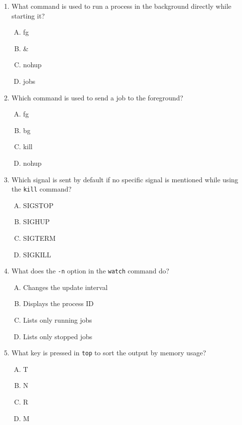 \documentclass[a4paper]{report}
\begin{document}
\begin{enumerate}[1.]

    \item What command is used to run a process in the background directly while starting it?  
    \begin{enumerate}[A)]
        \item fg  
        \item \&  
        \item nohup  
        \item jobs  
    \end{enumerate}

    \item Which command is used to send a job to the foreground?  
    \begin{enumerate}[A)]
        \item fg  
        \item bg  
        \item kill  
        \item nohup  
    \end{enumerate}

    \item Which signal is sent by default if no specific signal is mentioned while using the \texttt{kill} command?  
    \begin{enumerate}[A)]
        \item SIGSTOP  
        \item SIGHUP  
        \item SIGTERM  
        \item SIGKILL  
    \end{enumerate}

    \item What does the \texttt{-n} option in the \texttt{watch} command do?  
    \begin{enumerate}[A)]
        \item Changes the update interval  
        \item Displays the process ID  
        \item Lists only running jobs  
        \item Lists only stopped jobs  
    \end{enumerate}

    \item What key is pressed in \texttt{top} to sort the output by memory usage?  
    \begin{enumerate}[A)]
        \item T  
        \item N  
        \item R  
        \item M  
    \end{enumerate}


\end{enumerate}
\end{document}
